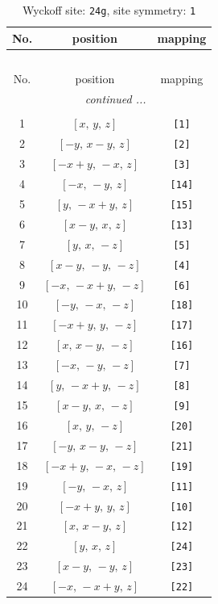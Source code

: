 \documentclass[fleqn,8pt]{jsarticle}
\begin{document}
\begin{longtable}{ccc}
\caption{Wyckoff site: {\tt 24g}, site symmetry: {\tt 1}}
 \\
 \hline \hline
No. & position & mapping \\ \hline \endfirsthead

\multicolumn{2}{l}{\tablename\ \thetable{}} \\
 \hline \hline
No. & position & mapping \\ \hline \endhead

 \hline \hline
\multicolumn{2}{r}{\footnotesize\it continued ...} \\ \endfoot

 \hline \hline
\multicolumn{2}{r}{} \\ \endlastfoot

1 & $\left[ x,\, y,\, z \right]$ & {\tt [1]} \\ \hline
2 & $\left[ - y,\, x - y,\, z \right]$ & {\tt [2]} \\ \hline
3 & $\left[ - x + y,\, - x,\, z \right]$ & {\tt [3]} \\ \hline
4 & $\left[ - x,\, - y,\, z \right]$ & {\tt [14]} \\ \hline
5 & $\left[ y,\, - x + y,\, z \right]$ & {\tt [15]} \\ \hline
6 & $\left[ x - y,\, x,\, z \right]$ & {\tt [13]} \\ \hline
7 & $\left[ y,\, x,\, - z \right]$ & {\tt [5]} \\ \hline
8 & $\left[ x - y,\, - y,\, - z \right]$ & {\tt [4]} \\ \hline
9 & $\left[ - x,\, - x + y,\, - z \right]$ & {\tt [6]} \\ \hline
10 & $\left[ - y,\, - x,\, - z \right]$ & {\tt [18]} \\ \hline
11 & $\left[ - x + y,\, y,\, - z \right]$ & {\tt [17]} \\ \hline
12 & $\left[ x,\, x - y,\, - z \right]$ & {\tt [16]} \\ \hline
13 & $\left[ - x,\, - y,\, - z \right]$ & {\tt [7]} \\ \hline
14 & $\left[ y,\, - x + y,\, - z \right]$ & {\tt [8]} \\ \hline
15 & $\left[ x - y,\, x,\, - z \right]$ & {\tt [9]} \\ \hline
16 & $\left[ x,\, y,\, - z \right]$ & {\tt [20]} \\ \hline
17 & $\left[ - y,\, x - y,\, - z \right]$ & {\tt [21]} \\ \hline
18 & $\left[ - x + y,\, - x,\, - z \right]$ & {\tt [19]} \\ \hline
19 & $\left[ - y,\, - x,\, z \right]$ & {\tt [11]} \\ \hline
20 & $\left[ - x + y,\, y,\, z \right]$ & {\tt [10]} \\ \hline
21 & $\left[ x,\, x - y,\, z \right]$ & {\tt [12]} \\ \hline
22 & $\left[ y,\, x,\, z \right]$ & {\tt [24]} \\ \hline
23 & $\left[ x - y,\, - y,\, z \right]$ & {\tt [23]} \\ \hline
24 & $\left[ - x,\, - x + y,\, z \right]$ & {\tt [22]} \\
\end{longtable}
\end{document}

